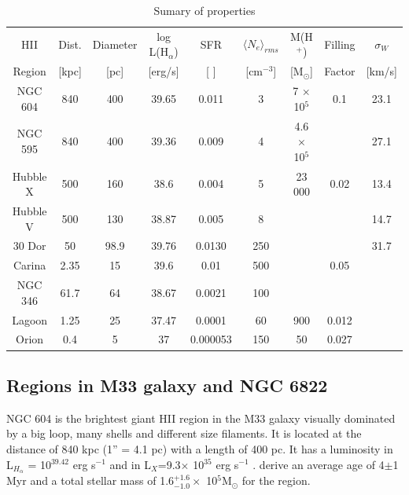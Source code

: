 \documentclass[fleqn,usenatbib, useAMS, a4paper]{mnras}
\begin{document}
\begin{table}
\begin{center}\caption{Sumary of properties \citep{1984ApJ...287..116K} \citep{1986ApJ...300..624R}}
\begin{tabular}{ccccccccc}\hline
HII    &  Dist.  & Diameter & log L(H$_{\alpha}$) & SFR      &  $ \langle N_{e} \rangle_{rms}$    & M(H$^{+}$) & Filling & \(\sigma_{W}\) \\
Region     &  [kpc] &  [pc]     &  [erg/s]            & [ ]      & [cm$^{-3}$] & [M$_{\odot}$] & Factor & [km/s] \\ \hline
NGC 604   &   840  & 400     &    39.65     & 0.011    & 3  & 7 $\times$ 10$^{5}$ & 0.1 & 23.1 \\
NGC 595   &   840  & 400     &    39.36     & 0.009    & 4  & 4.6 $\times$ 10$^{5}$ & & 27.1 \\
Hubble X  &   500  & 160     &    38.6      &  0.004   &  5 & 23 000& 0.02 & 13.4 \\
Hubble V  &   500  & 130     &    38.87     &  0.005   &  8 &    & & 14.7 \\
30 Dor    &   50   & 98.9    &    39.76     & 0.0130   & 250&    & & 31.7 \\
Carina    &   2.35 & 15      &    39.6      & 0.01     & 500&    & 0.05 & \\
NGC 346   &   61.7 & 64      &    38.67     & 0.0021   & 100&    &     & \\
Lagoon    &   1.25 & 25      &    37.47     & 0.0001   &  60& 900& 0.012 & \\
Orion     &   0.4  & 5       &    37        & 0.000053 & 150& 50 & 0.027 & \\
\end{tabular}\label{tab:Reg}
\end{center}
\end{table} 

\subsection{Regions in M33 galaxy and NGC 6822} 

NGC 604 is the brightest giant HII region in the M33 galaxy visually dominated by a big loop, many shells and different size filaments.
It is located at the distance of 840 kpc (1'' = 4.1 pc) \citep{2015KamKinematics} with a length of 400 pc.
It has a luminosity in L$_{H_\alpha}$ = 10$^{39.42}$ erg s$^{-1}$ \citep{2002MNRAS.329..481B} and in L$_{X}$=9.3$\times$ 10$^{35}$ erg s$^{-1}$ \citep{2008ApJ...685..919T}.
\citet{2012ApJ...761....3M} derive an average age of 4$\pm$1 Myr and a total stellar mass of 1.6$^{+1.6}_{-1.0} \times$ 10$^{5}$M$_{\odot}$ for the region.
\end{document}
